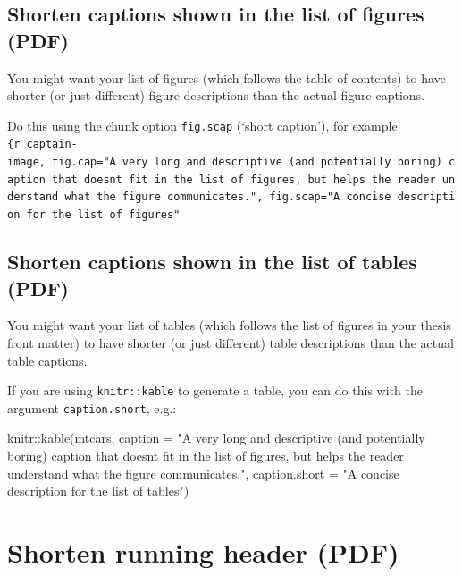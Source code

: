 \documentclass[a4paper, twoside]{templates/ociamthesis}
\newenvironment{Shaded}{\begin{snugshade}}{\end{snugshade}}
\newcommand{\AttributeTok}[1]{\textcolor[rgb]{0.77,0.63,0.00}{#1}}
\newcommand{\FunctionTok}[1]{\textcolor[rgb]{0.00,0.00,0.00}{#1}}
\newcommand{\NormalTok}[1]{#1}
\newcommand{\SpecialCharTok}[1]{\textcolor[rgb]{0.00,0.00,0.00}{#1}}
\newcommand{\StringTok}[1]{\textcolor[rgb]{0.31,0.60,0.02}{#1}}
\renewenvironment{Shaded}
{
  \vspace{10pt}%
  \begin{snugshade}%
}{%
  \end{snugshade}%
  \vspace{8pt}%
}
\begin{document}
\hypertarget{shorten-captions-shown-in-the-list-of-figures-pdf}{%
\subsection{Shorten captions shown in the list of figures (PDF)}\label{shorten-captions-shown-in-the-list-of-figures-pdf}}

You might want your list of figures (which follows the table of contents) to have shorter (or just different) figure descriptions than the actual figure captions.

Do this using the chunk option \texttt{fig.scap} (`short caption'), for example \texttt{\{r\ captain-image,\ fig.cap="A\ very\ long\ and\ descriptive\ (and\ potentially\ boring)\ caption\ that\ doesn\textquotesingle{}t\ fit\ in\ the\ list\ of\ figures,\ but\ helps\ the\ reader\ understand\ what\ the\ figure\ communicates.",\ fig.scap="A\ concise\ description\ for\ the\ list\ of\ figures"}

\hypertarget{shorten-captions-shown-in-the-list-of-tables-pdf}{%
\subsection{Shorten captions shown in the list of tables (PDF)}\label{shorten-captions-shown-in-the-list-of-tables-pdf}}

You might want your list of tables (which follows the list of figures in your thesis front matter) to have shorter (or just different) table descriptions than the actual table captions.

If you are using \texttt{knitr::kable} to generate a table, you can do this with the argument \texttt{caption.short}, e.g.:

\begin{Shaded}
\begin{Highlighting}[]
\NormalTok{knitr}\SpecialCharTok{::}\FunctionTok{kable}\NormalTok{(mtcars,}
              \AttributeTok{caption =} \StringTok{"A very long and descriptive (and potentially}
\StringTok{              boring) caption that doesn\textquotesingle{}t fit in the list of figures,}
\StringTok{              but helps the reader understand what the figure }
\StringTok{              communicates."}\NormalTok{,}
              \AttributeTok{caption.short =} \StringTok{"A concise description for the list of tables"}\NormalTok{)}
\end{Highlighting}
\end{Shaded}

\hypertarget{shorten-running-header-pdf}{%
\section{Shorten running header (PDF)}\label{shorten-running-header-pdf}}
\end{document}
